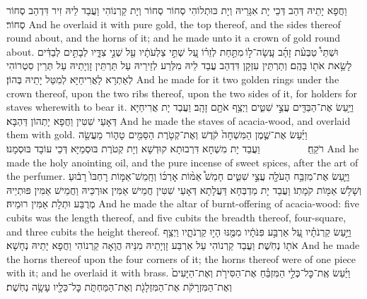 {{וַחֲפָא יָתֵיהּ דְּהַב דְּכֵי יָת אִגָּרֵיהּ וְיָת כּוּתְלוֹהִי סְחוֹר סְחוֹר וְיָת קַרְנוֹהִי וַעֲבַד לֵיהּ זִיר דִּדְהַב סְחוֹר סְחוֹר׃}
{And he overlaid it with pure gold, the top thereof, and the sides thereof round about, and the horns of it; and he made unto it a crown of gold round about.}{}
{וּשְׁתֵּי֩ טַבְּעֹ֨ת זָהָ֜ב עָֽשָׂה־ל֣וֹ \legarmeh  מִתַּ֣חַת לְזֵר֗וֹ עַ֚ל שְׁתֵּ֣י צַלְעֹתָ֔יו עַ֖ל שְׁנֵ֣י צִדָּ֑יו לְבָתִּ֣ים לְבַדִּ֔ים לָשֵׂ֥את אֹת֖וֹ בָּהֶֽם׃}
{וְתַרְתֵּין עִזְקָן דִּדְהַב עֲבַד לֵיהּ מִלְּרַע לְזֵירֵיהּ עַל תַּרְתֵּין זָוְיָתֵיהּ עַל תְּרֵין סִטְרוֹהִי לְאַתְרָא לַאֲרִיחַיָּא לְמִטַּל יָתֵיהּ בְּהוֹן׃}
{And he made for it two golden rings under the crown thereof, upon the two ribs thereof, upon the two sides of it, for holders for staves wherewith to bear it.}{}
{וַיַּ֥עַשׂ אֶת־הַבַּדִּ֖ים עֲצֵ֣י שִׁטִּ֑ים וַיְצַ֥ף אֹתָ֖ם זָהָֽב׃}
{וַעֲבַד יָת אֲרִיחַיָּא דְּאָעֵי שִׁטִּין וַחֲפָא יָתְהוֹן דַּהְבָּא׃}
{And he made the staves of acacia-wood, and overlaid them with gold.}{}
{וַיַּ֜עַשׂ אֶת־שֶׁ֤מֶן הַמִּשְׁחָה֙ קֹ֔דֶשׁ וְאֶת־קְטֹ֥רֶת הַסַּמִּ֖ים טָה֑וֹר מַעֲשֵׂ֖ה רֹקֵֽחַ׃ \setuma         }
{וַעֲבַד יָת מִשְׁחָא דִּרְבוּתָא קוּדְשָׁא וְיָת קְטֹרֶת בּוּסְמַיָּא דְּכֵי עוֹבָד בּוּסְמָנוּ׃}
{And he made the holy anointing oil, and the pure incense of sweet spices, after the art of the perfumer.}{}
\newperek
{}%
{וַיַּ֛עַשׂ אֶת־מִזְבַּ֥ח הָעֹלָ֖ה עֲצֵ֣י שִׁטִּ֑ים חָמֵשׁ֩ אַמּ֨וֹת אׇרְכּ֜וֹ וְחָֽמֵשׁ־אַמּ֤וֹת רׇחְבּוֹ֙ רָב֔וּעַ וְשָׁלֹ֥שׁ אַמּ֖וֹת קֹמָתֽוֹ׃}
{וַעֲבַד יָת מַדְבְּחָא דַּעֲלָתָא דְּאָעֵי שִׁטִּין חֲמֵישׁ אַמִּין אוּרְכֵּיהּ וַחֲמֵישׁ אַמִּין פּוּתְיֵיהּ מְרֻבַּע וּתְלָת אַמִּין רוּמֵיהּ׃}
{And he made the altar of burnt-offering of acacia-wood: five cubits was the length thereof, and five cubits the breadth thereof, four-square, and three cubits the height thereof.}{}
{וַיַּ֣עַשׂ קַרְנֹתָ֗יו עַ֚ל אַרְבַּ֣ע פִּנֹּתָ֔יו מִמֶּ֖נּוּ הָי֣וּ קַרְנֹתָ֑יו וַיְצַ֥ף אֹת֖וֹ נְחֹֽשֶׁת׃}
{וַעֲבַד קַרְנוֹהִי עַל אַרְבַּע זָוְיָתֵיהּ מִנֵּיהּ הֲוָאָה קַרְנוֹהִי וַחֲפָא יָתֵיהּ נְחָשָׁא׃}
{And he made the horns thereof upon the four corners of it; the horns thereof were of one piece with it; and he overlaid it with brass.}{}
{וַיַּ֜עַשׂ אֶֽת־כׇּל־כְּלֵ֣י הַמִּזְבֵּ֗חַ אֶת־הַסִּירֹ֤ת וְאֶת־הַיָּעִים֙ וְאֶת־הַמִּזְרָקֹ֔ת אֶת־הַמִּזְלָגֹ֖ת וְאֶת־הַמַּחְתֹּ֑ת כׇּל־כֵּלָ֖יו עָשָׂ֥ה נְחֹֽשֶׁת׃}
}

